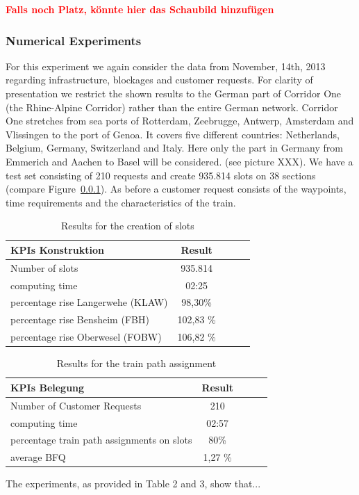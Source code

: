 \textbf{\textcolor{red}{Falls noch Platz, könnte hier das Schaubild hinzufügen}}

\subsubsection{Numerical Experiments}
For this experiment we again consider the data from November, 14th, 2013 regarding infrastructure, blockages and customer requests. For clarity of presentation we restrict the shown results to the German part of Corridor One (the Rhine-Alpine Corridor) \cite{} rather than the entire German network. Corridor One stretches from sea ports of Rotterdam, Zeebrugge, Antwerp, Amsterdam and Vlissingen to the port of Genoa. It covers five different countries: Netherlands, Belgium, Germany, Switzerland and Italy. Here only the part in Germany from Emmerich and Aachen to Basel will be considered. (see picture XXX). We have a test set consisting of 210 requests and create 935.814 slots on 38 sections (compare Figure~\ref{}).
As before a customer request consists of the waypoints, time requirements and the characteristics of the train.


\begin{table}[h]
	\centering
	\caption{Results for the creation of slots}
	\label{tab:result_Netzfpl}
	\begin{tabular}{lcccc} \hline
		\textbf{KPIs Konstruktion}   & \textbf{Result}  \\ \hline
		Number of slots             & 935.814                      \\
		computing time       & 02:25                     \\
		percentage rise Langerwehe (KLAW)   & 98,30\%                       \\
		percentage rise Bensheim (FBH) & 102,83 \%                       \\ 
		percentage rise Oberwesel (FOBW) & 106,82 \%                     \\ \hline
	\end{tabular}
\end{table}
\par

\begin{table}[h]
	\centering
	\caption{Results for the train path assignment}
	\label{tab:result_Netzfpl_Bel}
	\begin{tabular}{lcccc} \hline
		\textbf{KPIs Belegung}   & \textbf{Result}  \\ \hline
		Number of Customer Requests             & 210                      \\
		computing time       & 02:57                     \\
		percentage train path assignments on slots   & 80\%                       \\
		average BFQ & 1,27 \%                             \\ \hline
	\end{tabular}
\end{table}
\par

The experiments, as provided in Table 2 and 3, show that...
